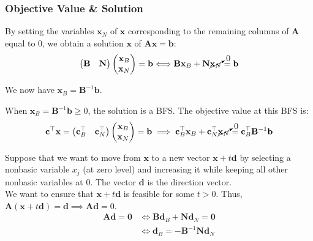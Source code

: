 \documentclass{article}
\begin{document}
\subsubsection{Objective Value \& Solution}

By setting the variables $\mathbf{x}_N$ of $\mathbf{x}$ corresponding to the remaining columns of $\mathbf{A}$ equal to 0, we obtain a solution $\mathbf{x}$ of $\mathbf{A}\mathbf{x} = \mathbf{b}$: \begin{equation*}
    \begin{pmatrix}
        \mathbf{B} & \mathbf{N}
    \end{pmatrix} \begin{pmatrix}
        \mathbf{x}_B \\ 
        \mathbf{x}_N
    \end{pmatrix} = \mathbf{b} \Longleftrightarrow\mathbf{B}\mathbf{x}_B + \mathbf{N}\cancelto{0}{\mathbf{x}_N} = \mathbf{b}
\end{equation*}

\noindent We now have $\mathbf{x}_B = \mathbf{B}^{-1}\mathbf{b}$. \begin{theorem}
    When $\mathbf{x}_B = \mathbf{B}^{-1}\mathbf{b} \geq 0$, the solution is a BFS. The objective value at this BFS is: \begin{equation*}
        \mathbf{c}^{\top} \mathbf{x} = \begin{pmatrix}
            \mathbf{c}^{\top}_B & \mathbf{c}^{\top}_N
        \end{pmatrix} \begin{pmatrix}
            \mathbf{x}_B \\ 
            \mathbf{x}_N 
        \end{pmatrix} = \mathbf{b} \implies \mathbf{c}^{\top}_B \mathbf{x}_B + \mathbf{c}^{\top}_N \cancelto{0}{\mathbf{x}_N} = \mathbf{c}^{\top}_B \mathbf{B}^{-1}\mathbf{b}
    \end{equation*}
\end{theorem}

\noindent Suppose that we want to move from $\mathbf{x}$ to a new vector $\mathbf{x} + t \mathbf{d}$ by selecting a nonbasic variable $x_j$ (at zero level) and increasing it while keeping all other nonbasic variables at 0. The vector $\mathbf{d}$ is the direction vector. \\ 

\noindent We want to ensure that $\mathbf{x} + t \mathbf{d}$ is feasible for some $t > 0$. Thus, $\mathbf{A}(\mathbf{x} + t \mathbf{d}) = \mathbf{d} \implies \mathbf{Ad} = 0$. \begin{align*}
    \mathbf{Ad} = \mathbf{0} &\Longleftrightarrow \mathbf{B}\mathbf{d}_B + \mathbf{N}\mathbf{d}_N = \mathbf{0} \\ 
    & \Longleftrightarrow \mathbf{d}_B = - \mathbf{B}^{-1}\mathbf{N}\mathbf{d}_N
\end{align*}
\end{document}
